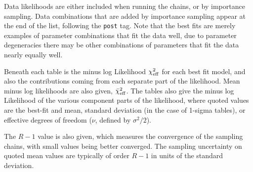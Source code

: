 Data likelihoods are either included when running the chains, or by importance sampling. Data combinations that are added by importance sampling appear
at the end of the list, following the {\tt post{\textunderscore}} tag. Note that the best fits are merely examples of parameter combinations that fit the data well, due to parameter degeneracies there may be other combinations of parameters that fit the data nearly equally well.

Beneath each table is the minus log Likelihood $\chi^2_{\rm eff}$ for each best fit model, and also the contributions coming from each separate part of the likelihood. Mean minus log likelihoods are also given, $\bar{\chi}^2_{\rm eff}$.
The tables also give the minus log Likelihood of the various component parts of the likelihood, where quoted values are the best-fit and mean, standard deviation (in the case of 1-sigma tables), or effective degrees of freedom ($\nu$, defined by $\sigma^2/2$).

The $R-1$ value is also given, which measures the convergence of the sampling chains, with small values being better converged. The sampling uncertainty on quoted mean values are typically of order $R-1$ in units of the standard deviation.


\newpage
